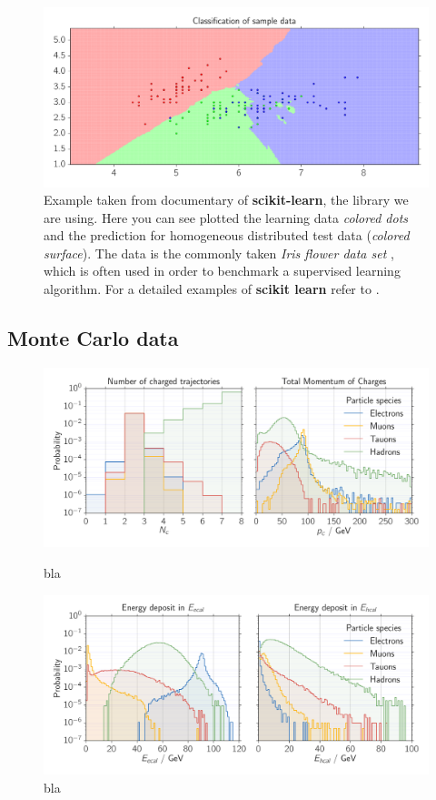 \begin{figure}[htpb]
    \centering
    \includegraphics[width=1\linewidth]{figures/kneigbors}
    \caption{Example taken from documentary of \textbf{scikit-learn}\cite{scikit-learn}, the library we are using. Here you can
    see plotted the learning data \textit{colored dots} and the prediction for homogeneous distributed test data
(\textit{colored surface}). The data is the commonly taken \textit{Iris flower data set} \cite{frank1968numerical}, which
    is often used in order to benchmark a supervised learning algorithm. For a detailed examples of \textbf{scikit learn}
    refer to \cite{masteringscikit}.}
\label{fig:kneigbors}
\end{figure}
\clearpage
\subsection{Monte Carlo data}
\label{sub:montecarlo}

\begin{figure}[htpb]
    \centering
    \includegraphics[width=1.0\linewidth]{figures/N_p_c}
    \caption{bla}
    \includegraphics[width=1.0\linewidth]{figures/E_cal}
    \caption{bla}
\label{fig:monte1}
\end{figure}

